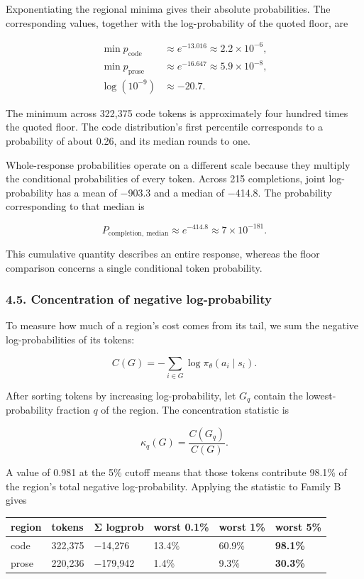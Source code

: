 \documentclass[
  11pt,
]{article}
\begin{document}
Exponentiating the regional minima gives their absolute probabilities.
The corresponding values, together with the log-probability of the
quoted floor, are

\[
\begin{aligned}
\min p_{\mathrm{code}}&\approx e^{-13.016}\approx2.2\times10^{-6},\\
\min p_{\mathrm{prose}}&\approx e^{-16.647}\approx5.9\times10^{-8},\\
\log(10^{-9})&\approx-20.7.
\end{aligned}
\]

The minimum across 322,375 code tokens is approximately four hundred
times the quoted floor. The code distribution's first percentile
corresponds to a probability of about 0.26, and its median rounds to
one.

Whole-response probabilities operate on a different scale because they
multiply the conditional probabilities of every token. Across 215
completions, joint log-probability has a mean of −903.3 and a median of
−414.8. The probability corresponding to that median is

\[
P_{\mathrm{completion,\ median}}\approx e^{-414.8}\approx7\times10^{-181}.
\]

This cumulative quantity describes an entire response, whereas the floor
comparison concerns a single conditional token probability.

\hypertarget{concentration-of-probability-mass}{%
\subsubsection{4.5. Concentration of negative
log-probability}\label{concentration-of-probability-mass}}

To measure how much of a region's cost comes from its tail, we sum the
negative log-probabilities of its tokens:

\[
C(G)=-\sum_{i\in G}\log\pi_\theta(a_i\mid s_i).
\]

After sorting tokens by increasing log-probability, let \(G_q\) contain
the lowest-probability fraction \(q\) of the region. The concentration
statistic is

\[
\kappa_q(G)=\frac{C(G_q)}{C(G)}.
\]

A value of 0.981 at the 5\% cutoff means that those tokens contribute
98.1\% of the region's total negative log-probability. Applying the
statistic to Family B gives

\begin{center}
\begin{minipage}{\linewidth}
\centering
\begin{tabular}{@{}llllll@{}}
\toprule
region & tokens & Σ logprob & worst 0.1\% & worst 1\% & worst 5\% \\
\midrule

code & 322,375 & −14,276 & 13.4\% & 60.9\% & \textbf{98.1\%} \\
prose & 220,236 & −179,942 & 1.4\% & 9.3\% & \textbf{30.3\%} \\
\bottomrule
\end{tabular}
\end{minipage}
\end{center}
\end{document}

